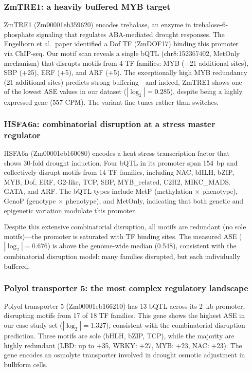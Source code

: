 \documentclass[11pt,a4paper]{article}
\begin{document}
\subsubsection{ZmTRE1: a heavily buffered MYB target}

ZmTRE1 (Zm00001eb359620) encodes trehalase, an enzyme in trehalose-6-phosphate signaling that regulates ABA-mediated drought responses. The Engelhorn et al.\ paper identified a Dof TF (ZmDOF17) binding this promoter via ChIP-seq. Our motif scan reveals a single bQTL (chr8:152367402, MetOnly mechanism) that disrupts motifs from 4 TF families: MYB (+21 additional sites), SBP (+25), ERF (+5), and ARF (+5). The exceptionally high MYB redundancy (21 additional sites) predicts strong buffering---and indeed, ZmTRE1 shows one of the lowest ASE values in our dataset ($|\log_2| = 0.285$), despite being a highly expressed gene (557 CPM). The variant fine-tunes rather than switches.

\subsubsection{HSFA6a: combinatorial disruption at a stress master regulator}

HSFA6a (Zm00001eb160080) encodes a heat stress transcription factor that shows 30-fold drought induction. Four bQTL in its promoter span 154~bp and collectively disrupt motifs from 14 TF families, including NAC, bHLH, bZIP, MYB, Dof, ERF, G2-like, TCP, SBP, MYB\_related, C2H2, MIKC\_MADS, GATA, and ARF. The bQTL types include MetP (methylation $\times$ phenotype), GenoP (genotype $\times$ phenotype), and MetOnly, indicating that both genetic and epigenetic variation modulate this promoter.

Despite this extensive combinatorial disruption, all motifs are redundant (no sole motifs)---the promoter is saturated with TF binding sites. The measured ASE ($|\log_2| = 0.676$) is above the genome-wide median (0.548), consistent with the combinatorial disruption model: many families disrupted, but each individually buffered.

\subsubsection{Polyol transporter 5: the most complex regulatory landscape}

Polyol transporter 5 (Zm00001eb166210) has 13 bQTL across its 2~kb promoter, disrupting motifs from 17 of 18 TF families. This gene shows the highest ASE in our case study set ($|\log_2| = 1.327$), consistent with the combinatorial disruption prediction. Three motifs are sole (bHLH, bZIP, TCP), while the majority are highly redundant (LBD: up to +35, WRKY: +27, MYB: +23, NAC: +23). The gene encodes an osmolyte transporter involved in drought osmotic adjustment in bulliform cells.
\end{document}
